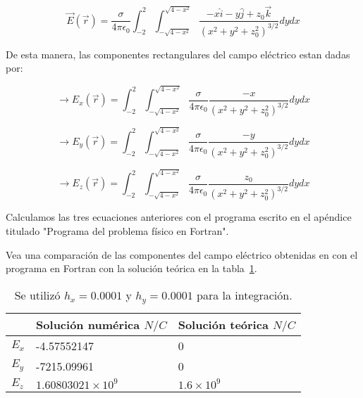 \begin{equation}
    \vec{E} (\vec{r}) = \frac{\sigma}{4\pi \epsilon_0} 
    \displaystyle\int_{-2}^{2} 
    \displaystyle\int_{- \sqrt{4 - x^2} }^{\sqrt{4 - x^2}}
    \frac{ -x \hat{i} - y \hat{j} + z_{0} \vec{k} }{\left( x^2 + y^2 + z_{0}^{2} \right)^{3/2}} dy dx
\end{equation}

De esta manera, las componentes rectangulares del campo eléctrico estan dadas por:

\begin{equation}
    \longrightarrow
    E_{x} (\vec{r}) =  
    \displaystyle\int_{-2}^{2} 
    \displaystyle\int_{- \sqrt{4 - x^2} }^{\sqrt{4 - x^2}}
    \frac{\sigma}{4\pi \epsilon_0}
    \frac{ -x }{\left( x^2 + y^2 + z_{0}^{2} \right)^{3/2}} dy dx
\end{equation}

\begin{equation}
    \longrightarrow
    E_{y} (\vec{r}) =  
    \displaystyle\int_{-2}^{2} 
    \displaystyle\int_{- \sqrt{4 - x^2} }^{\sqrt{4 - x^2}}
    \frac{\sigma}{4\pi \epsilon_0}
    \frac{ -y }{\left( x^2 + y^2 + z_{0}^{2} \right)^{3/2}} dy dx
\end{equation}

\begin{equation}
    \longrightarrow
    E_{z} (\vec{r}) =  
    \displaystyle\int_{-2}^{2} 
    \displaystyle\int_{- \sqrt{4 - x^2} }^{\sqrt{4 - x^2}}
    \frac{\sigma}{4\pi \epsilon_0}
    \frac{ z_0 }{\left( x^2 + y^2 + z_{0}^{2} \right)^{3/2}} dy dx
\end{equation}

Calculamos las tres ecuaciones anteriores con el programa escrito en el apéndice titulado "Programa del problema físico en Fortran". 

Vea una comparación de las componentes del campo eléctrico obtenidas en con el programa en Fortran con la solución teórica en la tabla~\ref{table_results}.

\begin{table}[hbt!]
    \begin{threeparttable}
    \begin{tabular}{lll}
    \toprule
    \headrow & Solución numérica $N/C$ & Solución teórica $N/C$ \\
    \midrule
    $E_x$ & -4.57552147 & 0 \\ 
    \midrule
    $E_y$ & -7215.09961 & 0 \\ 
    \midrule
    $E_z$ & $1.60803021 \times 10^9$ & $1.6 \times 10^9$ \\ 
    \bottomrule
    \end{tabular}
    \caption{Se utilizó $h_x = 0.0001$ y $h_y = 0.0001$ para la integración.}
    \label{table_results}
\end{threeparttable}
\end{table}

